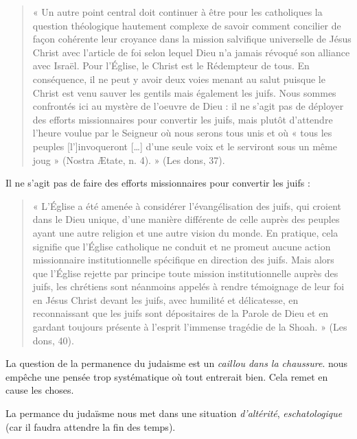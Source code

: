  
 \begin{quote}
    «  Un  autre  point  central  doit  continuer  à  être  pour  les  catholiques  la  question  théologique hautement  complexe  de  savoir  comment  concilier  de  façon  cohérente  leur  croyance  dans  la mission  salvifique  universelle  de  Jésus  Christ  avec  l’article  de  foi  selon  lequel  Dieu  n’a jamais  révoqué  son  alliance  avec  Israël.  Pour  l’Église,  le  Christ  est  le  Rédempteur  de  tous.  En conséquence,  il  ne  peut  y  avoir  deux  voies  menant  au  salut  puisque  le  Christ  est  venu  sauver les  gentils  mais  également  les  juifs.  Nous  sommes  confrontés  ici  au  mystère  de  l’oeuvre  de Dieu  :  il  ne  s’agit  pas  de  déployer  des  efforts  missionnaires  pour  convertir  les  juifs,  mais plutôt  d’attendre  l’heure  voulue  par  le  Seigneur  où  nous  serons  tous  unis  et  où  «  tous  les peuples  [l’]invoqueront  […]  d’une  seule  voix  et  le  serviront  sous  un  même  joug  »  (Nostra Ætate, n. 4).  »  (Les  dons, 37). 
\end{quote}   
Il ne s'agit pas de faire des efforts missionnaires pour convertir les juifs : 
\begin{quote}
     «  L’Église  a  été  amenée  à  considérer  l’évangélisation  des  juifs,  qui  croient  dans  le  Dieu unique,  d’une  manière  différente  de  celle  auprès  des  peuples  ayant  une  autre  religion  et  une autre  vision  du  monde.  En  pratique,  cela  signifie  que  l’Église  catholique  ne  conduit  et  ne promeut  aucune  action  missionnaire  institutionnelle  spécifique  en  direction  des  juifs.  Mais alors  que  l’Église  rejette  par  principe  toute  mission  institutionnelle  auprès  des  juifs,  les chrétiens  sont  néanmoins  appelés  à  rendre  témoignage  de  leur  foi  en  Jésus  Christ  devant  les juifs,  avec  humilité  et  délicatesse,  en  reconnaissant  que  les  juifs  sont  dépositaires  de  la  Parole de  Dieu  et  en  gardant  toujours  présente  à  l’esprit  l’immense  tragédie  de  la  Shoah.  »  (Les  dons, 40). 
\end{quote} 
 La question de la permanence du judaisme est un \textit{caillou dans la chaussure}. nous empêche une pensée trop systématique où tout entrerait bien. Cela remet en cause les choses. 
 \begin{Synthesis}
 La permance du judaïsme nous met dans une situation \textit{d'altérité}, \textit{eschatologique} (car il faudra attendre la fin des temps).
 \end{Synthesis}
 
 